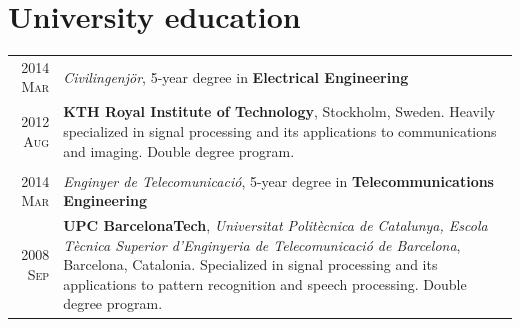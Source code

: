 \documentclass[a4paper,10pt]{article}
\begin{document}

  \section{University education}

    \begin{tabular}{r|p{13cm}}	
    
      \textsc{2014 Mar}  & \emph{Civilingenj\"{o}r}, 5-year degree in \textbf{Electrical Engineering} \\
      \textsc{2012 Aug}  & \footnotesize{\textbf{KTH Royal Institute of Technology}, Stockholm, Sweden. 
			   Heavily specialized in signal processing and its applications to communications and imaging. Double degree program.} \\ 
      \multicolumn{2}{c}{} \\

      
      \textsc{2014 Mar}  & \emph{Enginyer de Telecomunicaci\'{o}}, 5-year degree in \textbf{Telecommunications Engineering} \\  
      \textsc{2008 Sep}  & \footnotesize{\textbf{UPC BarcelonaTech}, \emph{Universitat Polit\`{e}cnica de Catalunya, Escola T\`{e}cnica Superior
			   d'Enginyeria de Telecomunicaci\'{o} de Barcelona}, Barcelona, Catalonia. 
			   Specialized in signal processing and its applications to pattern recognition and speech processing. Double degree program.} \\
    \end{tabular}

    \renewcommand\refname{Publications}
    \nocite{AguilaPla2017,AguilaPla2017a,AguilaPla2018,AguilaPla2018a,AguilaPla2014,Mabtech2017}
    
    
	
\end{document}
